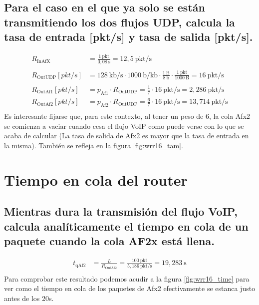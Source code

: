 \subsection{Para el caso en el que ya solo se están transmitiendo los dos flujos UDP, calcula la tasa de entrada [pkt/s] y
tasa de salida [pkt/s].}
\[
    \begin{aligned}
        R_{\text{InAfX}} &= \frac{1~\text{pkt}}{0,08~\text{s}} = 12,5~\text{pkt/s} \\ \\
        R_{\text{OutUDP}}[pkt/s] &= 128~\text{kb/s} \cdot 1000~\text{b/kb} \cdot \frac{1~\text{B}}{8~\text{b}} \cdot \frac{1~\text{pkt}}{1000~\text{B}} = 16~\text{pkt/s} \\ \\
        R_{\text{OutAf1}}[pkt/s] &= p_{\text{Af1}} \cdot R_{\text{OutUDP}} = \frac{1}{7} \cdot 16~\text{pkt/s} = 2,286~\text{pkt/s} \\
        R_{\text{OutAf2}}[pkt/s] &= p_{\text{Af2}} \cdot R_{\text{OutUDP}} = \frac{6}{7} \cdot 16~\text{pkt/s} = 13,714~\text{pkt/s} \\
    \end{aligned}
\]
Es interesante fijarse que, para este contexto, al tener un peso de 6, la cola Afx2 se comienza a vaciar 
cuando cesa el flujo VoIP como puede verse con lo que se acaba de calcular (La tasa de salida de Afx2 es mayor 
que la tasa de entrada en la misma). También se refleja en la figura \ref{fig:wrr16_tam}.

\vspace{1cm}

\section{Tiempo en cola del router}
\subsection{Mientras dura la transmisión del flujo VoIP, calcula analíticamente el tiempo en cola de un paquete cuando
la cola AF2x está llena.}
\[
    \begin{aligned}
        t_{\text{qAf2}} &= \frac{L}{R_{\text{OutAf2}}} = \frac{100~\text{pkt}}{5,186~\text{pkt/s}}= 19,283~\text{s} \\
    \end{aligned}
\]
Para comprobar este resultado podemos acudir a la figura \ref{fig:wrr16_time} para ver como el tiempo 
en cola de los paquetes de Afx2 efectivamente se estanca justo antes de los 20s.

